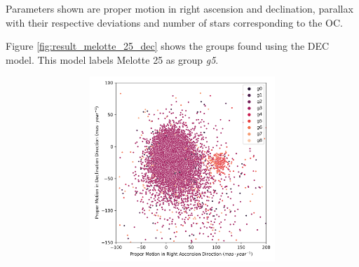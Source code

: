 \documentclass[11pt,a4paper,english,twocolumn]{article}
\begin{document}
Parameters shown are proper motion in right ascension and declination, parallax
with their respective deviations and number of stars corresponding to the OC.

Figure \ref{fig:result_melotte_25_dec} shows the groups found using the DEC model.
This model labels Melotte 25 as group \emph{g5}.

\begin{figure}[htbp]
  \centering
  \begin{subfigure}{\columnwidth}
    \centering
    \begin{subfigure}[t]{0.30\textwidth}
      \centering
      \includegraphics[width=\textwidth]{../figures/melotte_25/dec_pm_melotte_25.png}
    \end{subfigure}
    \hfill
    \begin{subfigure}[t]{0.30\textwidth}
      \centering

\end{subfigure}
\end{subfigure}
\end{figure}
\end{document}
